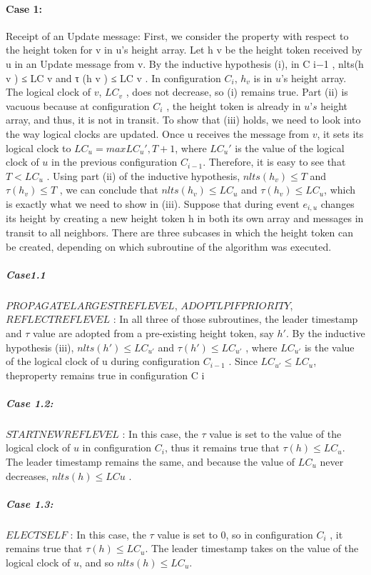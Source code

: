 \documentclass{article}
\begin{document}
\paragraph{Case 1:} Receipt of an Update message: First, we consider the property with respect to the height token for v in u’s height array. Let h v be the height token received by u in an Update message from v. By the inductive hypothesis (i), in C i−1 , nlts(h v ) ≤ LC v and τ (h v ) ≤ LC v . In configuration $C_i$, $h_v$ is in $u$’s height array. The logical clock of $v$, $LC_v$ , does not decrease, so (i) remains true. Part (ii) is vacuous because at configuration $C_i$ , the height token is already in $u’s$ height array, and thus, it is not in transit. To show that (iii) holds, we need to look into the way logical clocks are updated. Once u receives the message from $v$, it sets its logical clock to $LC_u = max{LC_u', T} + 1$, where $LC_u'$ is the value of the logical clock of $u$ in the previous configuration $C_{i − 1}$.
Therefore, it is easy to see that $T < LC_u$ . Using part (ii) of the inductive hypothesis, $nlts(h_v) \leq T$ and $\tau (h_v) \leq T$ , we can conclude that $nlts(h_v) \leq LC_u$ and $\tau (h_v) \leq LC_u$, which is exactly what we need to show in (iii).
Suppose that during event $e_{i, u}$ changes its height by creating a new height token h in both its own array and messages in transit to all neighbors. There are three subcases in which the height token can be created, depending on which subroutine of the algorithm was executed.
\subparagraph{Case1.1}
$PROPAGATELARGESTREFLEVEL$, $ADOPTLPIFPRIORITY$, $REFLECTREFLEVEL$ : In all three of those subroutines, the leader timestamp and $\tau $ value are adopted from a pre-existing height token, say $h'$. By the inductive hypothesis (iii), $nlts(h') \leq LC_{u'} $ and $\tau (h') \leq LC_{u'}$ , where $LC_{u'}$ is the value of the logical clock
of u during configuration $C_{i − 1}$ . Since $LC_{u'} \leq LC_u$, theproperty remains true in configuration C i

\subparagraph{Case 1.2:}
$STARTNEWREFLEVEL$ : In this case, the $\tau $ value is set to the value of the logical clock of $u$ in configuration $C_i$, thus it remains true that $\tau (h) \leq LC_u$. The leader timestamp remains the same, and because the value of $LC_u$ never decreases, $nlts(h) \leq LC u$ .
\subparagraph{Case 1.3:}
$ELECTSELF$ : In this case, the $\tau $ value is set to 0, so in configuration $C_i$ , it remains true that $\tau (h) \leq LC_u$.
The leader timestamp takes on the value of the logical clock of $u$, and so $nlts(h) \leq LC_u$.
\end{document}
